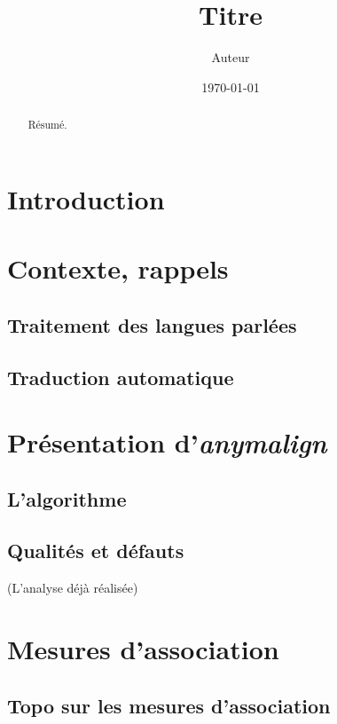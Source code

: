 \documentclass{article}
\title{Titre}
\author{Auteur}
\date{\today}
\begin{document}
\maketitle
\begin{abstract}
Résumé.
\end{abstract}
\newpage
\tableofcontents
\newpage


\section{Introduction}



\section{Contexte, rappels}

\subsection{Traitement des langues parlées}

\subsection{Traduction automatique}



\section{Présentation d'\emph{anymalign}}

\subsection{L'algorithme}

\subsection{Qualités et défauts}
(L'analyse déjà réalisée)


\section{Mesures d'association}

\subsection{Topo sur les mesures d'association}
\end{document}
